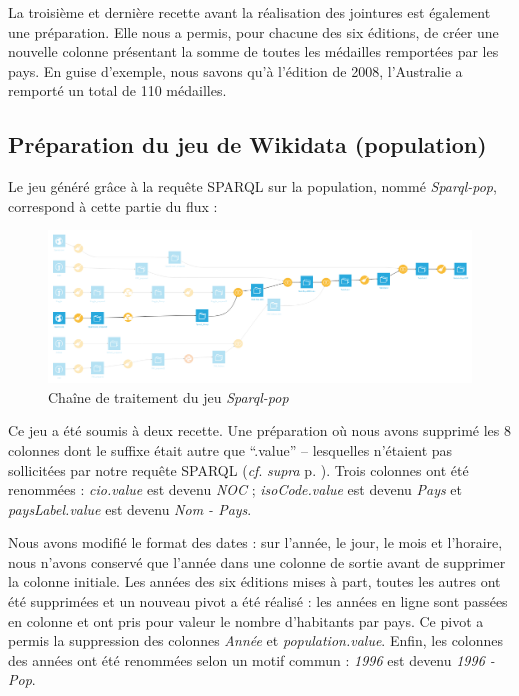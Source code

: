 \documentclass[hidelinks, 12pt]{report}
\begin{document}
La troisième et dernière recette avant la réalisation des jointures est également une préparation. Elle nous a permis, pour chacune des six éditions, de créer une nouvelle colonne présentant la somme de toutes les médailles remportées par les pays. En guise d'exemple, nous savons qu'à l'édition de 2008, l'Australie a remporté un total de 110 médailles.





%





\subsection{Préparation du jeu de Wikidata (population)}

Le jeu généré grâce à la requête SPARQL sur la population, nommé \textit{Sparql-pop}, correspond à cette partie du flux :

\begin{center}
	\begin{figure}[H]
		\setlength{\belowcaptionskip}{-35pt}
		\includegraphics[scale=0.35]{images/flow-medals-sparql-pop.png}
		\caption{Chaîne de traitement du jeu \textit{Sparql-pop}}
	\end{figure}
\end{center}

Ce jeu a été soumis à deux recette. Une préparation où nous avons supprimé les 8 colonnes dont le suffixe était autre que \enquote{.value} -- lesquelles n'étaient pas sollicitées par notre requête SPARQL (\textit{cf}. \textit{supra} p. \pageref{nongrata}). Trois colonnes ont été renommées : \textit{cio.value} est devenu \textit{NOC} ; \textit{isoCode.value} est devenu \textit{Pays} et \textit{paysLabel.value} est devenu \textit{Nom - Pays}.

Nous avons modifié le format des dates : sur l'année, le jour, le mois et l'horaire, nous n'avons conservé que l'année dans une colonne de sortie avant de supprimer la colonne initiale. Les années des six éditions mises à part, toutes les autres ont été supprimées et un nouveau pivot a été réalisé : les années en ligne sont passées en colonne et ont pris pour valeur le nombre d'habitants par pays. Ce pivot a permis la suppression des colonnes \emph{Année} et \emph{population.value}. Enfin, les colonnes des années ont été renommées selon un motif commun : \emph{1996} est devenu \emph{1996 - Pop}.
\end{document}
